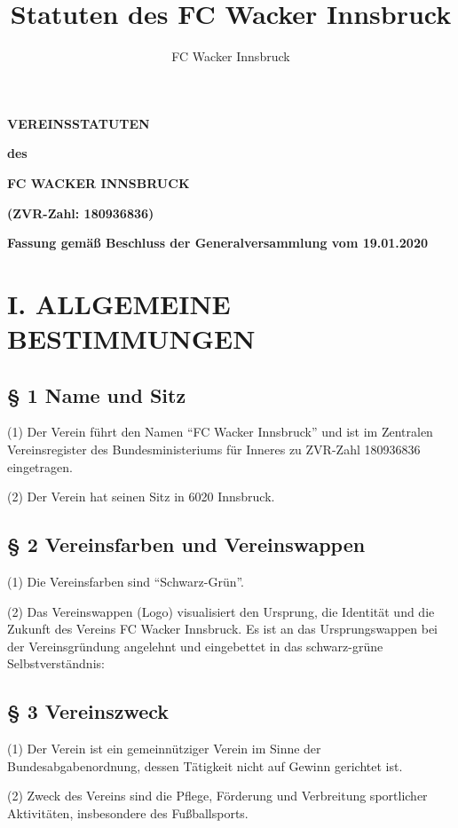 \documentclass[11pt,a4paper]{article}
\author{FC Wacker Innsbruck}
\title{Statuten des FC Wacker Innsbruck}
\begin{document}
\setlength{\parskip}{25pt}
\setcounter{secnumdepth}{0}
\centering

\textbf{\huge VEREINSSTATUTEN}

\textbf{des}

\textbf{\huge FC WACKER INNSBRUCK}

\textbf{(ZVR-Zahl: 180936836)}

\vspace{100ex}

\textbf{Fassung gemäß Beschluss der Generalversammlung vom 19.01.2020}

\clearpage
\flushleft
\setlength{\parskip}{10pt}

\tableofcontents

\clearpage

\section{I. ALLGEMEINE BESTIMMUNGEN}

\subsection{§ 1
Name und Sitz}

(1)
Der Verein führt den Namen "`FC Wacker Innsbruck"' und ist im Zentralen Vereinsregister des Bundesministeriums für Inneres zu ZVR-Zahl 180936836 eingetragen.

(2)
Der Verein hat seinen Sitz in 6020 Innsbruck.

\subsection{§ 2
Vereinsfarben und Vereinswappen}

(1)
Die Vereinsfarben sind "`Schwarz-Grün"'.

(2)
Das Vereinswappen (Logo) visualisiert den Ursprung, die Identität und die Zukunft des Vereins FC Wacker Innsbruck.
Es ist an das Ursprungswappen bei der Vereinsgründung angelehnt und eingebettet in das schwarz-grüne Selbstverständnis:

\subsection{§ 3
Vereinszweck}

(1)
Der Verein ist ein gemeinnütziger Verein im Sinne der Bundesabgabenordnung, dessen Tätigkeit nicht auf Gewinn gerichtet ist.

(2)
Zweck des Vereins sind die Pflege, Förderung und Verbreitung sportlicher Aktivitäten, insbesondere des Fußballsports.
\end{document}
